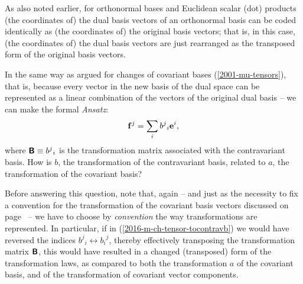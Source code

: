 As also noted earlier,  for orthonormal bases and Euclidean scalar (dot) products (the coordinates of) the dual basis vectors of an orthonormal basis can be coded identically
as  (the coordinates of) the original basis vectors; that is,
in this case,
(the coordinates of) the dual basis vectors are just rearranged as the transposed form of the original basis vectors.


In the same way as argued for changes of covariant bases (\ref{2001-mu-tensors}),
that is, because every vector in the new basis of the dual space can be represented as a linear combination of the vectors of the original dual basis -- we can make the formal {\it Ansatz}:
\begin{equation}
{\bf f}^j=\sum_i{b^j}_i{\bf e}^i,
\label{2016-m-ch-tensor-tocontravb}
\end{equation}
where $ \textsf{\textbf{B}} \equiv {b^j}_i$ is
the transformation matrix associated with the contravariant basis.
How is $b$, the transformation of the contravariant basis, related to $a$,
the transformation of the covariant basis?

Before answering this question, note that, again -- and just as the necessity to fix a convention for the transformation of the covariant basis vectors discussed on page~\pageref{2016-m-ch-fdvs-oic} --
we have to choose by {\em convention} the way transformations are represented.
In particular,
if in (\ref{2016-m-ch-tensor-tocontravb}) we would have reversed the indices ${b^j}_i \leftrightarrow {b_i}^j$, thereby effectively transposing the transformation matrix  $ \textsf{\textbf{B}} $,
this would have resulted in a changed (transposed) form of the transformation laws,
as compared to both the transformation $a$ of the covariant basis, and of the transformation of covariant vector components.

